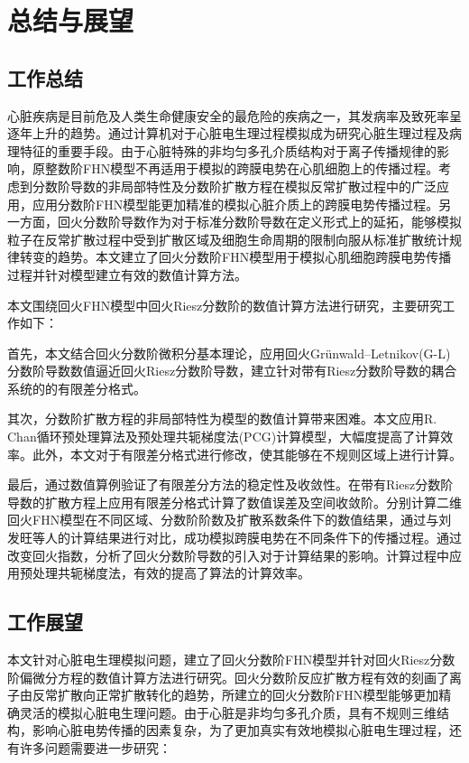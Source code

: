 \documentclass[twoside,UTF8]{nputhesis}
\begin{document}
\chapter{总结与展望}

\section{工作总结}
心脏疾病是目前危及人类生命健康安全的最危险的疾病之一，其发病率及致死率呈逐年上升的趋势。通过计算机对于心脏电生理过程模拟成为研究心脏生理过程及病理特征的重要手段。由于心脏特殊的非均匀多孔介质结构对于离子传播规律的影响，原整数阶FHN模型不再适用于模拟的跨膜电势在心肌细胞上的传播过程。考虑到分数阶导数的非局部特性及分数阶扩散方程在模拟反常扩散过程中的广泛应用，应用分数阶FHN模型能更加精准的模拟心脏介质上的跨膜电势传播过程。另一方面，回火分数阶导数作为对于标准分数阶导数在定义形式上的延拓，能够模拟粒子在反常扩散过程中受到扩散区域及细胞生命周期的限制向服从标准扩散统计规律转变的趋势。本文建立了回火分数阶FHN模型用于模拟心肌细胞跨膜电势传播过程并针对模型建立有效的数值计算方法。

本文围绕回火FHN模型中回火Riesz分数阶的数值计算方法进行研究，主要研究工作如下：

首先，本文结合回火分数阶微积分基本理论，应用回火Grünwald–Letnikov(G-L)分数阶导数数值逼近回火Riesz分数阶导数，建立针对带有Riesz分数阶导数的耦合系统的的有限差分格式。

其次，分数阶扩散方程的非局部特性为模型的数值计算带来困难。本文应用R. Chan循环预处理算法及预处理共轭梯度法(PCG)计算模型，大幅度提高了计算效率。此外，本文对于有限差分格式进行修改，使其能够在不规则区域上进行计算。

最后，通过数值算例验证了有限差分方法的稳定性及收敛性。在带有Riesz分数阶导数的扩散方程上应用有限差分格式计算了数值误差及空间收敛阶。分别计算二维回火FHN模型在不同区域、分数阶阶数及扩散系数条件下的数值结果，通过与刘发旺等人的计算结果进行对比，成功模拟跨膜电势在不同条件下的传播过程。通过改变回火指数，分析了回火分数阶导数的引入对于计算结果的影响。计算过程中应用预处理共轭梯度法，有效的提高了算法的计算效率。

\section{工作展望}
本文针对心脏电生理模拟问题，建立了回火分数阶FHN模型并针对回火Riesz分数阶偏微分方程的数值计算方法进行研究。回火分数阶反应扩散方程有效的刻画了离子由反常扩散向正常扩散转化的趋势，所建立的回火分数阶FHN模型能够更加精确灵活的模拟心脏电生理问题。由于心脏是非均匀多孔介质，具有不规则三维结构，影响心脏电势传播的因素复杂，为了更加真实有效地模拟心脏电生理过程，还有许多问题需要进一步研究：
\end{document}
